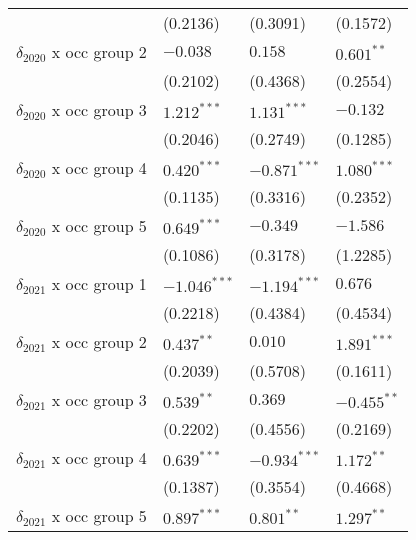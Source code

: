 \begin{tabular}{llll}
                                       &           (0.2136) &           (0.3091) &           (0.1572) \\
$\delta_{2020}$ x occ group 2          &           $-0.038$ &            $0.158$ &       $0.601^{**}$ \\
                                       &           (0.2102) &           (0.4368) &           (0.2554) \\
$\delta_{2020}$ x occ group 3          &      $1.212^{***}$ &      $1.131^{***}$ &           $-0.132$ \\
                                       &           (0.2046) &           (0.2749) &           (0.1285) \\
$\delta_{2020}$ x occ group 4          &      $0.420^{***}$ &     $-0.871^{***}$ &      $1.080^{***}$ \\
                                       &           (0.1135) &           (0.3316) &           (0.2352) \\
$\delta_{2020}$ x occ group 5          &      $0.649^{***}$ &           $-0.349$ &           $-1.586$ \\
                                       &           (0.1086) &           (0.3178) &           (1.2285) \\
$\delta_{2021}$ x occ group 1          &     $-1.046^{***}$ &     $-1.194^{***}$ &            $0.676$ \\
                                       &           (0.2218) &           (0.4384) &           (0.4534) \\
$\delta_{2021}$ x occ group 2          &       $0.437^{**}$ &            $0.010$ &      $1.891^{***}$ \\
                                       &           (0.2039) &           (0.5708) &           (0.1611) \\
$\delta_{2021}$ x occ group 3          &       $0.539^{**}$ &            $0.369$ &      $-0.455^{**}$ \\
                                       &           (0.2202) &           (0.4556) &           (0.2169) \\
$\delta_{2021}$ x occ group 4          &      $0.639^{***}$ &     $-0.934^{***}$ &       $1.172^{**}$ \\
                                       &           (0.1387) &           (0.3554) &           (0.4668) \\
$\delta_{2021}$ x occ group 5          &      $0.897^{***}$ &       $0.801^{**}$ &       $1.297^{**}$ \\

\end{tabular}

